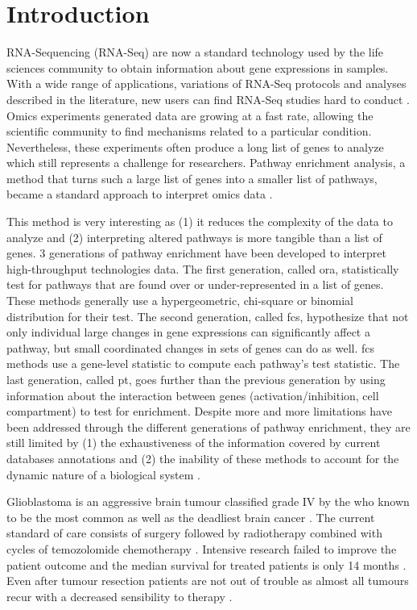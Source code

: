 \section{Introduction}

RNA-Sequencing (RNA-Seq) are now a standard technology used by the life sciences community to obtain information about gene expressions in samples.
With a wide range of applications, variations of RNA-Seq protocols and analyses described in the literature, new users can find RNA-Seq studies hard to conduct \cite*{Conesa2016}.
Omics experiments generated data are growing at a fast rate, allowing the scientific community to find mechanisms related to a particular condition.
Nevertheless, these experiments often produce a long list of genes to analyze which still represents a challenge for researchers. 
Pathway enrichment analysis, a method that turns such a large list of genes into a smaller list of pathways, became a standard approach to interpret omics data \cite*{Reimand2019}.

This method is very interesting as (1) it reduces the complexity of the data to analyze and (2) interpreting altered pathways is more tangible than a list of genes.
3 generations of pathway enrichment have been developed to interpret high-throughput technologies data.
The first generation, called \acrfull{ora}, statistically test for pathways that are found over or under-represented in a list of genes.
These methods generally use a hypergeometric, chi-square or binomial distribution for their test.
The second generation, called \acrfull{fcs}, hypothesize that not only individual large changes in gene expressions can significantly affect a pathway, but small coordinated changes in sets of genes can do as well.
\acrshort{fcs} methods use a gene-level statistic to compute each pathway's test statistic.
The last generation, called \acrfull{pt}, goes further than the previous generation by using information about the interaction between genes (activation/inhibition, cell compartment) to test for enrichment.
Despite more and more limitations have been addressed through the different generations of pathway enrichment, they are still limited by (1) the exhaustiveness of the information covered by current databases annotations and (2) the inability of these methods to account for the dynamic nature of a biological system \cite*{Khatri2012}.

Glioblastoma is an aggressive brain tumour classified grade IV by the \acrfull{who} known to be the most common as well as the deadliest brain cancer \cite*{Quinones2018,Cheng2015}.
The current standard of care consists of surgery followed by radiotherapy combined with cycles of temozolomide chemotherapy \cite*{LeRhun2019}.
Intensive research failed to improve the patient outcome and the median survival for treated patients is only 14 months \cite*{Delgado-Lopez2016}.
Even after tumour resection patients are not out of trouble as almost all tumours recur with a decreased sensibility to therapy \cite*{Campos2016}.

